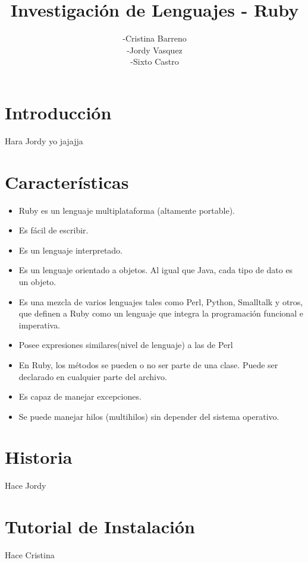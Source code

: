 \documentclass[11pt]{article} %
\title{Investigación de Lenguajes - Ruby}
\author{-Cristina Barreno \\ -Jordy Vasquez \\ -Sixto Castro}
\begin{document}
\maketitle

\section{Introducción}
 Hara Jordy
yo jajajja

\section{Características}

\begin{itemize}

      \item  Ruby es un lenguaje multiplataforma (altamente portable).
      \item  Es fácil de escribir. 
      \item  Es un lenguaje interpretado.
      \item  Es un lenguaje orientado a objetos. Al igual que Java, cada tipo de dato es un objeto.
      \item  Es una mezcla de varios lenguajes tales como Perl, Python, Smalltalk y otros, que definen a Ruby como un lenguaje que integra la programación funcional e imperativa.
      \item  Posee expresiones similares(nivel de lenguaje) a las de Perl
      \item  En Ruby, los métodos se pueden o no ser parte de una clase. Puede ser declarado en cualquier parte del archivo.
      \item  Es capaz de manejar excepciones.
      \item  Se puede manejar hilos (multihilos) sin depender del sistema operativo.

\end{itemize}

\section{Historia}
Hace Jordy

\section{Tutorial de Instalación}
Hace Cristina
\end{document}
